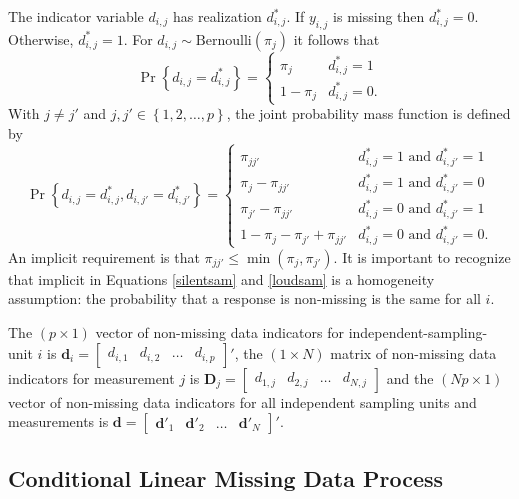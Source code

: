 \documentclass[11pt]{article}
\begin{document}
The indicator variable $d_{i,j}$ has realization $d^{\ast}_{i,j}$. If $y_{i,j}$ is missing then $d^{\ast}_{i,j}=0$. Otherwise, $d^{\ast}_{i,j}=1$. For $d_{i,j}\sim\text{Bernoulli}\left(\pi_{j}\right)$ it follows that 
\begin{equation}
\label{silentsam}
\Pr\left\{d_{i,j}=d^{\ast}_{i,j}\right\}=
\begin{cases}
\pi_{j}&d^{\ast}_{i,j}=1\\
1-\pi_{j}&d^{\ast}_{i,j}=0.
\end{cases}
\end{equation}
With $j\neq j'$ and $j,j'\in\left\{1,2,\ldots,p\right\}$, the joint probability mass function is defined by
\begin{equation}
\label{loudsam}
\Pr\left\{d_{i,j}=d^{\ast}_{i,j},d_{i,j'}=d^{\ast}_{i,j'}\right\}=
\begin{cases}
\pi_{jj'}&d^{\ast}_{i,j}=1\text{ and }d^{\ast}_{i,j'}=1\\
\pi_j-\pi_{jj'}&d^{\ast}_{i,j}=1\text{ and }d^{\ast}_{i,j'}=0\\
\pi_{j'}-\pi_{jj'}&d^{\ast}_{i,j}=0\text{ and }d^{\ast}_{i,j'}=1\\
1-\pi_j-\pi_{j'}+\pi_{jj'}&d^{\ast}_{i,j}=0\text{ and }d^{\ast}_{i,j'}=0.
\end{cases}
\end{equation}
An implicit requirement is that $\pi_{jj'}\leq\min\left(\pi_{j},\pi_{j'}\right)$. It is important to recognize that implicit in Equations \ref{silentsam} and \ref{loudsam} is a homogeneity assumption: the probability that a response is non-missing is the same for all $i$. 

The $\left(p\times 1\right)$ vector of non-missing data indicators for independent-sampling-unit $i$ is $\boldsymbol{d}_{i}=\begin{bmatrix}d_{i,1}&d_{i,2}&\ldots&d_{i,p}\end{bmatrix}'$, the $\left(1\times N\right)$ matrix of non-missing data indicators for measurement $j$ is $\boldsymbol{D}_{j}=\begin{bmatrix}d_{1,j}&d_{2,j}&\ldots&d_{N,j}\end{bmatrix}$ and the $\left(Np\times 1\right)$ vector of non-missing data indicators for all independent sampling units and measurements is $\boldsymbol{d}=\begin{bmatrix}\boldsymbol{d}'_{1}&\boldsymbol{d}'_{2}&\ldots&\boldsymbol{d}'_{N}\end{bmatrix}'$.

\subsection{Conditional Linear Missing Data Process}
\label{missingmodels}
\end{document}
